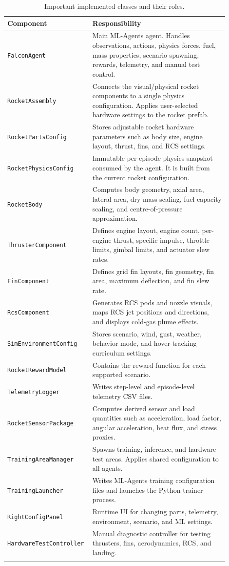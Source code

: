 \documentclass[12pt,a4paper]{article}
\begin{document}
\begin{longtable}{p{0.30\linewidth} p{0.60\linewidth}}
\toprule
\textbf{Component} & \textbf{Responsibility} \\
\midrule
\endhead
\texttt{FalconAgent} & Main ML-Agents agent. Handles observations, actions, physics forces, fuel, mass properties, scenario spawning, rewards, telemetry, and manual test control. \\
\texttt{RocketAssembly} & Connects the visual/physical rocket components to a single physics configuration. Applies user-selected hardware settings to the rocket prefab. \\
\texttt{RocketPartsConfig} & Stores adjustable rocket hardware parameters such as body size, engine layout, thrust, fins, and RCS settings. \\
\texttt{RocketPhysicsConfig} & Immutable per-episode physics snapshot consumed by the agent. It is built from the current rocket configuration. \\
\texttt{RocketBody} & Computes body geometry, axial area, lateral area, dry mass scaling, fuel capacity scaling, and centre-of-pressure approximation. \\
\texttt{ThrusterComponent} & Defines engine layout, engine count, per-engine thrust, specific impulse, throttle limits, gimbal limits, and actuator slew rates. \\
\texttt{FinComponent} & Defines grid fin layouts, fin geometry, fin area, maximum deflection, and fin slew rate. \\
\texttt{RcsComponent} & Generates RCS pods and nozzle visuals, maps RCS jet positions and directions, and displays cold-gas plume effects. \\
\texttt{SimEnvironmentConfig} & Stores scenario, wind, gust, weather, behavior mode, and hover-tracking curriculum settings. \\
\texttt{RocketRewardModel} & Contains the reward function for each supported scenario. \\
\texttt{TelemetryLogger} & Writes step-level and episode-level telemetry CSV files. \\
\texttt{RocketSensorPackage} & Computes derived sensor and load quantities such as acceleration, load factor, angular acceleration, heat flux, and stress proxies. \\
\texttt{TrainingAreaManager} & Spawns training, inference, and hardware test areas. Applies shared configuration to all agents. \\
\texttt{TrainingLauncher} & Writes ML-Agents training configuration files and launches the Python trainer process. \\
\texttt{RightConfigPanel} & Runtime UI for changing parts, telemetry, environment, scenario, and ML settings. \\
\texttt{HardwareTestController} & Manual diagnostic controller for testing thrusters, fins, aerodynamics, RCS, and landing. \\
\bottomrule
\caption{Important implemented classes and their roles.}
\end{longtable}
\end{document}
